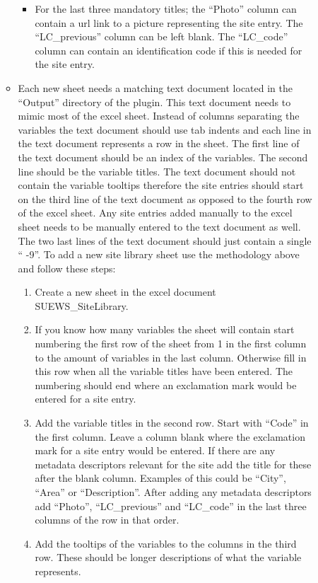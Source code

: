 \documentclass[letterpaper,10pt,english]{sphinxmanual}
\begin{document}
\begin{itemize}
\begin{description}
\begin{itemize}
\begin{itemize}
\item {} 
For the last three mandatory titles; the “Photo” column can contain a url link to a picture representing the site entry. The “LC\_previous” column can be left blank. The “LC\_code” column can contain an identification code if this is needed for the site entry.

\end{itemize}

\item {} 
Each new sheet needs a matching text document located in the “Output” directory of the plugin. This text document needs to mimic most of the excel sheet. Instead of columns separating the variables the text document should use tab indents and each line in the text document represents a row in the sheet. The first line of the text document should be an index of the variables. The second line should be the variable titles. The text document should not contain the variable tooltips therefore       the site entries should start on the third line of the text document as opposed to the fourth row of the excel sheet. Any site entries added manually to the excel sheet needs to be manually entered to the text document as well. The two last lines of the text document should just contain a single “  -9”. To add a new site library sheet use the methodology above and follow these steps:
\begin{enumerate}
\item {} 
Create a new sheet in the excel document SUEWS\_SiteLibrary.

\item {} 
If you know how many variables the sheet will contain start numbering the first row of the sheet from 1 in the first column to the amount of variables in the last column. Otherwise fill in this row when all the variable titles have been entered. The numbering should end where an exclamation mark would be entered for a site entry.

\item {} 
Add the variable titles in the second row. Start with “Code” in the first column. Leave a column blank where the exclamation mark for a site entry would be entered. If there are any metadata descriptors relevant for the site add the title for these after the blank column. Examples of this could be “City”, “Area” or “Description”. After adding any metadata descriptors add “Photo”, “LC\_previous” and “LC\_code” in the last three columns of the row in that order.

\item {} 
Add the tooltips of the variables to the columns in the third row. These should be longer descriptions of what the variable represents.


\end{enumerate}
\end{itemize}
\end{description}
\end{itemize}
\end{document}
